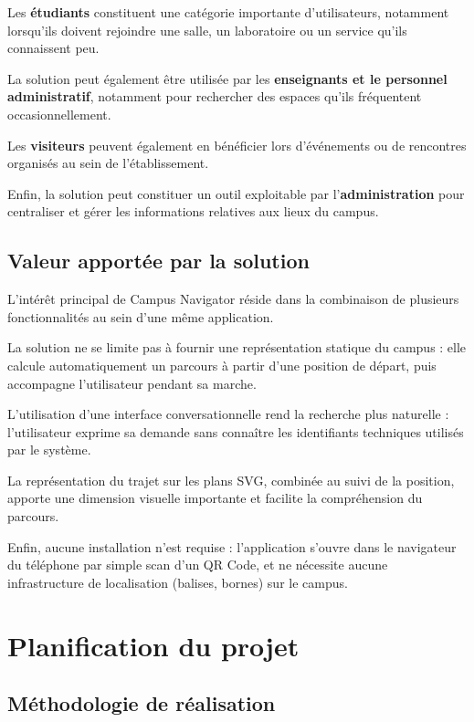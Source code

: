 \documentclass[12pt,a4paper]{report}
\begin{document}
Les \textbf{étudiants} constituent une catégorie importante d'utilisateurs, notamment lorsqu'ils
doivent rejoindre une salle, un laboratoire ou un service qu'ils connaissent peu.

La solution peut également être utilisée par les \textbf{enseignants et le personnel
administratif}, notamment pour rechercher des espaces qu'ils fréquentent occasionnellement.

Les \textbf{visiteurs} peuvent également en bénéficier lors d'événements ou de rencontres
organisés au sein de l'établissement.

Enfin, la solution peut constituer un outil exploitable par l'\textbf{administration} pour
centraliser et gérer les informations relatives aux lieux du campus.

\subsection{Valeur apportée par la solution}

L'intérêt principal de Campus Navigator réside dans la combinaison de plusieurs fonctionnalités
au sein d'une même application.

La solution ne se limite pas à fournir une représentation statique du campus : elle calcule
automatiquement un parcours à partir d'une position de départ, puis accompagne l'utilisateur
pendant sa marche.

L'utilisation d'une interface conversationnelle rend la recherche plus naturelle : l'utilisateur
exprime sa demande sans connaître les identifiants techniques utilisés par le système.

La représentation du trajet sur les plans SVG, combinée au suivi de la position, apporte une
dimension visuelle importante et facilite la compréhension du parcours.

Enfin, aucune installation n'est requise : l'application s'ouvre dans le navigateur du téléphone
par simple scan d'un QR Code, et ne nécessite aucune infrastructure de localisation (balises,
bornes) sur le campus.

\section{Planification du projet}

\subsection{Méthodologie de réalisation}
\end{document}
